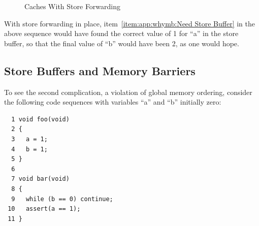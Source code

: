 \begin{figure}[htb]
\begin{center}
\end{center}
\caption{Caches With Store Forwarding}
\label{fig:app:whymb:Caches With Store Forwarding}
\end{figure}

With store forwarding in place, item~\ref{item:app:whymb:Need Store Buffer}
in the above sequence would have found the correct value of 1 for ``a'' in
the store buffer, so that the final value of ``b'' would have been 2,
as one would hope.

\subsection{Store Buffers and Memory Barriers}
\label{sec:app:whymb:Store Buffers and Memory Barriers}

To see the second complication, a violation of global memory ordering,
consider the following code sequences
with variables ``a'' and ``b'' initially zero:

\vspace{5pt}
\begin{minipage}[t]{\columnwidth}
\small
\begin{verbatim}
  1 void foo(void)
  2 {
  3   a = 1;
  4   b = 1;
  5 }
  6
  7 void bar(void)
  8 {
  9   while (b == 0) continue;
 10   assert(a == 1);
 11 }
\end{verbatim}
\end{minipage}
\vspace{5pt}


